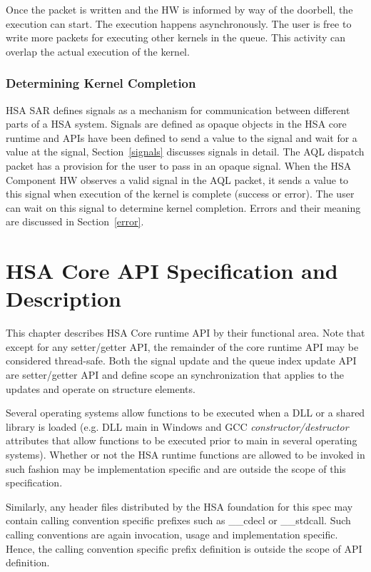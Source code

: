 \documentclass{book}
\begin{document}
Once the packet is written and the HW is informed by way of the
doorbell, the execution can start. The execution happens
asynchronously. The user is free to write more packets for executing
other kernels in the queue. This activity can overlap the actual
execution of the kernel.

\subsection{Determining Kernel Completion}
HSA SAR defines signals as a mechanism for communication between
different parts of a HSA system. Signals are defined as opaque
objects in the HSA core runtime and APIs have been defined to send a
value to the signal and wait for a value at the signal,
Section~\ref{signals} discusses signals in detail. The AQL dispatch
packet has a provision for the user to pass in an opaque signal.
When the HSA Component HW observes a valid signal in the AQL packet,
it sends a value to this signal when execution of the kernel is
complete (success or error). The user can wait on this signal to
determine kernel completion. Errors and their
meaning are discussed in Section~\ref{error}.
\begin{framed}

\end{framed}

\chapter{HSA Core A\-P\-I Specification and Description} \label{coreapi}
\hypertarget{coreapi}{}
This chapter describes HSA Core runtime API by their functional
area. Note that except for any setter/getter API, the remainder of
the core runtime API may be considered thread-safe.  Both the signal
update and the queue index update API are setter/getter API and
define scope an synchronization that applies to the updates and
operate on structure elements.

Several operating systems allow functions to be executed when a DLL
or a shared library is loaded (e.g. DLL main in Windows and GCC
\emph{constructor/destructor} attributes that allow functions to be
executed prior to main in several operating systems).
Whether or not the HSA runtime functions are allowed to be invoked
in such fashion may be implementation specific and are outside the
scope of this specification.

Similarly, any header files distributed by the HSA foundation for
this spec may contain calling convention specific prefixes such as
\_\_cdecl or \_\_stdcall. Such calling conventions are again invocation,
usage and implementation specific. Hence, the calling convention
specific prefix definition is outside the scope of API definition.
\end{document}
